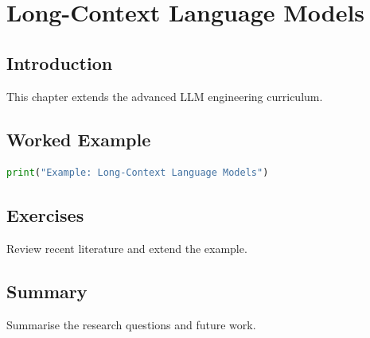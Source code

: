 \chapter{Long-Context Language Models}
\label{chap:vol13-7}



\section{Introduction}
This chapter extends the advanced LLM engineering curriculum.

\section{Worked Example}
\begin{lstlisting}[language=Python]
print("Example: Long-Context Language Models")
\end{lstlisting}

\section{Exercises}
\begin{exercise}
Review recent literature and extend the example.
\end{exercise}

\section{Summary}
Summarise the research questions and future work.
